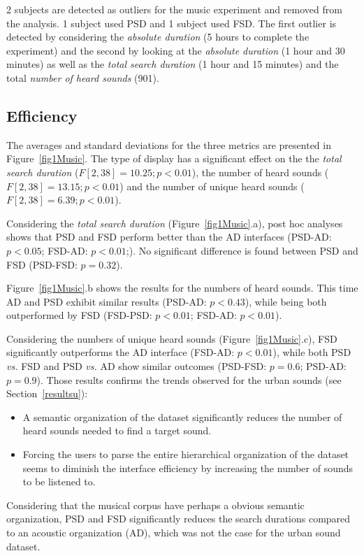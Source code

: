 \documentclass{aes2e}
\begin{document}
2 subjects are detected as outliers for the music experiment and removed from the analysis. 1 subject used PSD and 1 subject used FSD. The first outlier is detected by considering the \textit{absolute duration} (5 hours to complete the experiment) and the second by looking at the \textit{absolute duration} (1 hour and 30 minutes) as well as the \textit{total search duration} (1 hour and 15 minutes) and the total \textit{number of heard sounds} (901).

\subsection{Efficiency}

The averages and standard deviations for the three metrics are presented in Figure~\ref{fig1Music}. The type of display has a significant effect on the the \textit{total search duration} ($F[2,38]=10.25; p<0.01$), the number of heard sounds ($F[2,38]=13.15; p<0.01$) and the number of unique heard sounds ($F[2,38]=6.39; p<0.01$).

Considering the \textit{total search duration} (Figure~\ref{fig1Music}.a), post hoc analyses shows that PSD and FSD perform better than the AD interfaces (PSD-AD: $p<0.05$; FSD-AD: $p<0.01$;). No significant difference is found between PSD and FSD (PSD-FSD: $p=0.32$).

Figure~\ref{fig1Music}.b shows the results for the numbers of heard sounds. This time AD and PSD exhibit similar results (PSD-AD: $p<0.43$), while being both outperformed by FSD (FSD-PSD: $p<0.01$; FSD-AD: $p<0.01$).

Considering the numbers of unique heard sounds (Figure~\ref{fig1Music}.c), FSD significantly outperforms the AD interface (FSD-AD: $p<0.01$), while both PSD \emph{vs.} FSD and PSD \emph{vs.} AD show similar outcomes (PSD-FSD: $p=0.6$; PSD-AD: $p=0.9$). Those results confirms the trends observed for the urban sounds (see Section~\ref{resultsu}):

\begin{itemize}
\item A semantic organization of the dataset significantly reduces  the number of heard sounds needed to find a target sound.
\item Forcing the users to parse the entire hierarchical organization of the dataset seems to diminish the interface efficiency by increasing the number of sounds to be listened to.
\end{itemize}

Considering that the musical corpus have perhaps a obvious semantic organization, PSD and FSD significantly reduces the search durations compared to an acoustic organization (AD), which was not the case for the urban sound dataset.
\end{document}
